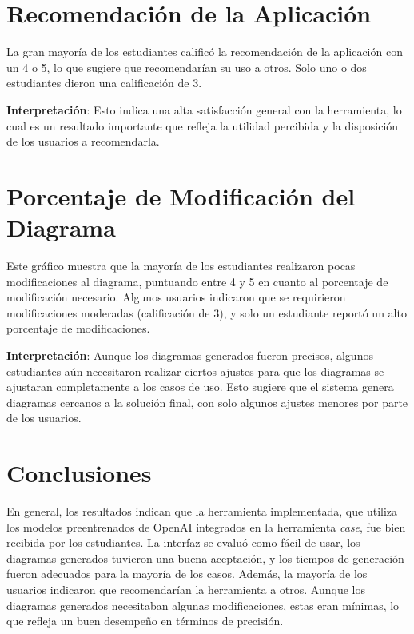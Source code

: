 \section{Recomendación de la Aplicación}

La gran mayoría de los estudiantes calificó la recomendación de la aplicación con un 4 o 5, lo que sugiere que recomendarían su uso a otros. Solo uno o dos estudiantes dieron una calificación de 3.

\textbf{Interpretación}: Esto indica una alta satisfacción general con la herramienta, lo cual es un resultado importante que refleja la utilidad percibida y la disposición de los usuarios a recomendarla.

\section{Porcentaje de Modificación del Diagrama}

Este gráfico muestra que la mayoría de los estudiantes realizaron pocas modificaciones al diagrama, puntuando entre 4 y 5 en cuanto al porcentaje de modificación necesario. Algunos usuarios indicaron que se requirieron modificaciones moderadas (calificación de 3), y solo un estudiante reportó un alto porcentaje de modificaciones.

\textbf{Interpretación}: Aunque los diagramas generados fueron precisos, algunos estudiantes aún necesitaron realizar ciertos ajustes para que los diagramas se ajustaran completamente a los casos de uso. Esto sugiere que el sistema genera diagramas cercanos a la solución final, con solo algunos ajustes menores por parte de los usuarios.

\section{Conclusiones}

En general, los resultados indican que la herramienta implementada, que utiliza los modelos preentrenados de OpenAI integrados en la herramienta \textit{case}, fue bien recibida por los estudiantes. La interfaz se evaluó como fácil de usar, los diagramas generados tuvieron una buena aceptación, y los tiempos de generación fueron adecuados para la mayoría de los casos. Además, la mayoría de los usuarios indicaron que recomendarían la herramienta a otros. Aunque los diagramas generados necesitaban algunas modificaciones, estas eran mínimas, lo que refleja un buen desempeño en términos de precisión.
